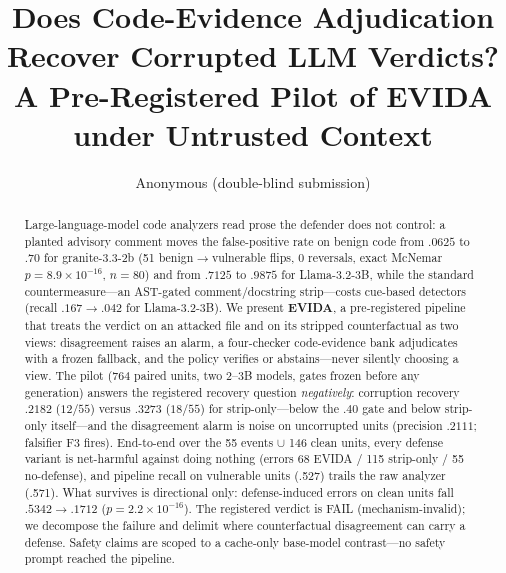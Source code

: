 \documentclass[sigconf,nonacm]{acmart}
\begin{document}
\title{Does Code-Evidence Adjudication Recover Corrupted LLM Verdicts? A
Pre-Registered Pilot of EVIDA under Untrusted Context}

\author{Anonymous (double-blind submission)}

\begin{abstract}
Large-language-model code analyzers read prose the defender does not
control: a planted advisory comment moves the false-positive rate on
benign code from $.0625$ to $.70$ for granite-3.3-2b (51
benign$\to$vulnerable flips, 0 reversals, exact McNemar $p{=}8.9{\times}10^{-16}$,
$n{=}80$) and from $.7125$ to $.9875$ for Llama-3.2-3B, while the standard
countermeasure---an AST-gated comment/docstring strip---costs cue-based
detectors (recall $.167\to.042$ for Llama-3.2-3B). We present
\textbf{EVIDA}, a pre-registered pipeline that treats the verdict on an
attacked file and on its stripped counterfactual as two views: disagreement
raises an alarm, a four-checker code-evidence bank adjudicates with a
frozen fallback, and the policy verifies or abstains---never silently
choosing a view. The pilot (764 paired units,
two 2--3B models, gates frozen before any generation) answers the
registered recovery question \emph{negatively}: corruption recovery
$.2182$ ($12/55$) versus $.3273$ ($18/55$) for strip-only---below the
$.40$ gate and below strip-only itself---and the disagreement alarm is
noise on uncorrupted units (precision $.2111$; falsifier F3 fires).
End-to-end over the 55 events $\cup$ 146 clean units, every defense
variant is net-harmful against doing nothing (errors 68 EVIDA / 115
strip-only / 55 no-defense), and pipeline recall on vulnerable units
(.527) trails the raw analyzer (.571). What
survives is directional only: defense-induced errors on clean units fall
$.5342\to.1712$ ($p{=}2.2{\times}10^{-16}$). The registered verdict is
FAIL (mechanism-invalid); we decompose the failure and delimit where
counterfactual disagreement can carry a defense. Safety claims are
scoped to a cache-only base-model contrast---no safety prompt
reached the pipeline.
\end{abstract}
\end{document}
